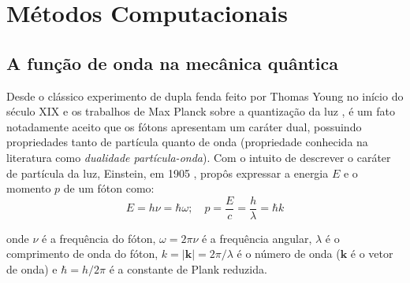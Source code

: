 

\chapter{Métodos Computacionais}

\section{A função de onda na mecânica quântica}
	
	Desde o clássico experimento de dupla fenda feito por Thomas Young no início do século XIX e os trabalhos de Max Planck sobre a quantização da luz \cite{planck1914warmestrahlung}, é um fato notadamente aceito que os fótons apresentam um caráter dual, possuindo propriedades tanto de partícula quanto de onda (propriedade conhecida na literatura como \textit{dualidade partícula-onda}). Com o intuito de descrever o caráter de partícula da luz, Einstein, em 1905 \cite{einstein1905heuristic}, propôs expressar a energia $E$ e o momento $p$ de um fóton como:
	\begin{equation}
		E = h\nu = \hbar \omega ; \quad p = \frac{E}{c} = \frac{h}{\lambda} = \hbar k
	\end{equation}
	
	onde $\nu$ é a frequência do fóton, $\omega = 2\pi \nu$ é a frequência angular, $\lambda$ é o comprimento de onda do fóton, $k=|\textbf{k}| = 2\pi/\lambda$ é o número de onda ($\textbf{k}$ é o vetor de onda) e $\hbar = h/2\pi$ é a constante de Plank reduzida. 
	

